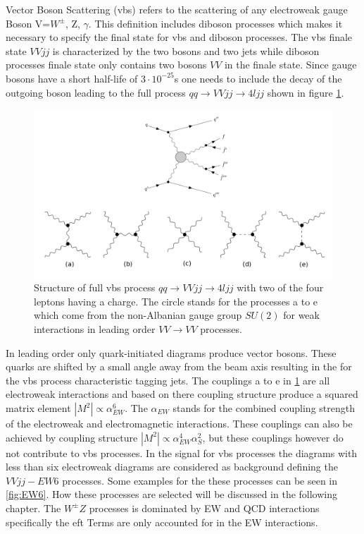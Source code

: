 \documentclass[../Bachelorarbeit.tex]{subfiles}
\begin{document}
\label{sec:VBS}

Vector Boson Scattering (\acrshort{vbs})\cite{Bittrich.27.05.2020} refers to the scattering of any electroweak gauge Boson V=$W^{\pm}$, Z, $\gamma$. This
definition includes diboson processes which makes it necessary to specify the final state for \acrshort{vbs} and diboson processes.
The \acrshort{vbs} finale state $VVjj$ is characterized by the two bosons and two jets while diboson processes finale state only contains
two bosons $VV$ in the finale state. Since gauge bosons have a short half-life of $3 \cdot 10^{-25}$s one needs to include the
decay of the outgoing boson leading to the full process $qq\rightarrow VVjj\rightarrow 4ljj$ shown in figure \ref{fig:feynman_full_VBS}.
\begin{figure}[h]
    \centering
    \includegraphics[width=\textwidth]{images/feynman_full_VBS.png}
    \caption{Structure of full \acrshort{vbs} process $qq\rightarrow VVjj\rightarrow 4ljj$ with two of the four leptons having a charge. The circle stands for the processes a to e
        which come from the non-Albanian gauge group $SU(2)$ for weak interactions in leading order $VV \rightarrow VV$ processes.\cite{Bittrich.27.05.2020}}
    \label{fig:feynman_full_VBS}
\end{figure}
In leading order only quark-initiated diagrams produce vector bosons. These quarks are shifted by a small angle away from
the beam axis resulting in the for the \acrshort{vbs} process characteristic tagging jets. The couplings a to e in \ref{fig:feynman_full_VBS}
are all electroweak interactions and based on there coupling structure produce a squared matrix element
$\left\lvert M^{2} \right\rvert \propto \alpha_{EW}^{6}$. The $\alpha_{EW}$ stands for the combined coupling strength of
the electroweak and electromagnetic interactions. These couplings can also be achieved by coupling structure
$\left\lvert M^{2} \right\rvert \propto \alpha_{EW}^{4}\alpha_{S}^{2}$, but these couplings however do not contribute to \acrshort{vbs} processes.
In the signal for \acrshort{vbs} processes the diagrams with less than six electroweak diagrams are considered as background defining the $VVjj-EW6$ processes.
Some examples for the these processes can be seen in \ref{fig:EW6}. How these processes are selected will be discussed in the following chapter.
The $W^{\pm}Z$ processes is dominated by EW and QCD interactions specifically the \acrshort{eft} Terms are only accounted for in the EW interactions.\\\\
\end{document}
